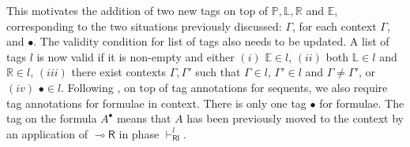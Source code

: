 \documentclass[submission,copyright,creativecommons]{eptcs}
\theoremstyle{definition}
\newtheorem{defn}{Definition}[section]
\newcommand{\lright}{{\multimap}\mathsf{R}}
\newcommand{\lleft}{{\multimap}\mathsf{L}}
\newcommand{\RI}{\mathsf{RI}}
\newcommand{\tP}{\mathbb{P}}
\newcommand{\tL}{\mathbb{L}}
\newcommand{\tR}{\mathbb{R}}
\newcommand{\tE}{\mathbb{E}}
\newcommand{\SkNMILLA}{$\mathtt{SkNMILLA}$}
\begin{document}


This motivates the addition of two new tags on top of $\tP,\tL,\tR$ and $\tE$, corresponding to the two situations previously discussed: $\Gamma$, for each context $\Gamma$, and $\bullet$.  The validity condition for list of tags also needs to be updated. A list of tags $l$ is now valid if it is non-empty and either $(i)$ $\tE \in l$, $(ii)$ both $\tL \in l$ and $\tR \in l$,  $(iii)$ there exist contexts $\Gamma , \Gamma'$ such that $ \Gamma \in l$, $ \Gamma' \in l$ and $ \Gamma \neq  \Gamma'$, or $(iv)$ $\bullet \in l$. Following \cite{UVW:protsn}, on top of tag annotations for sequents, we also require tag annotations for formulae in context. There is only one tag $\bullet$ for formulae. The tag on the formula $A^\bullet$ means that $A$ has been previously moved to the context by an application of $\lright$ in phase $\vdash^l_\RI$.
\end{document}
